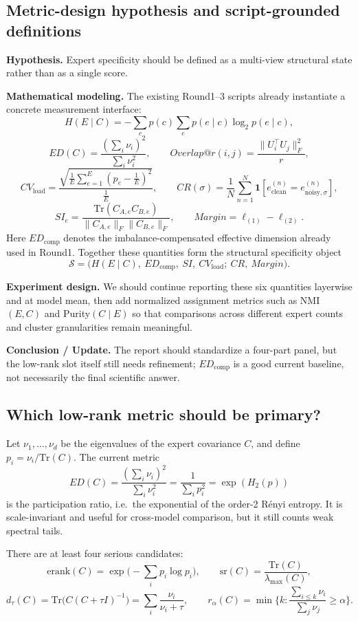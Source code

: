 \documentclass[11pt]{article}
\begin{document}
\subsection{Metric-design hypothesis and script-grounded definitions}
\textbf{Hypothesis.} Expert specificity should be defined as a multi-view structural state rather than as a single score.

\textbf{Mathematical modeling.} The existing Round1--3 scripts already instantiate a concrete measurement interface:
\[
H(E\mid C)
=
-\sum_c p(c)\sum_e p(e\mid c)\log_2 p(e\mid c),
\]
\[
ED(C)=\frac{(\sum_i \nu_i)^2}{\sum_i \nu_i^2},
\qquad
Overlap@r(i,j)=\frac{\|U_i^\top U_j\|_F^2}{r},
\]
\[
CV_{\mathrm{load}}
=
\frac{\sqrt{\frac{1}{E}\sum_{e=1}^E (p_e-\frac{1}{E})^2}}{\frac{1}{E}},
\qquad
CR(\sigma)=\frac{1}{N}\sum_{n=1}^N \mathbf{1}[e_{\mathrm{clean}}^{(n)}=e_{\mathrm{noisy},\sigma}^{(n)}],
\]
\[
SI_e=\frac{\mathrm{Tr}(C_{A,e}C_{B,e})}{\|C_{A,e}\|_F\|C_{B,e}\|_F},
\qquad
Margin=\ell_{(1)}-\ell_{(2)}.
\]
Here $ED_{\mathrm{comp}}$ denotes the imbalance-compensated effective dimension already used in Round1. Together these quantities form the structural specificity object
\[
\mathcal{S}
=
\big(H(E\mid C),\ ED_{\mathrm{comp}},\ SI,\ CV_{\mathrm{load}};\ CR,\ Margin\big).
\]

\textbf{Experiment design.} We should continue reporting these six quantities layerwise and at model mean, then add normalized assignment metrics such as NMI$(E,C)$ and Purity$(C\mid E)$ so that comparisons across different expert counts and cluster granularities remain meaningful.

\textbf{Conclusion / Update.} The report should standardize a four-part panel, but the low-rank slot itself still needs refinement; $ED_{\mathrm{comp}}$ is a good current baseline, not necessarily the final scientific answer.

\subsection{Which low-rank metric should be primary?}
Let $\nu_1,\dots,\nu_d$ be the eigenvalues of the expert covariance $C$, and define $p_i=\nu_i/\mathrm{Tr}(C)$. The current metric
\[
ED(C)=\frac{(\sum_i \nu_i)^2}{\sum_i \nu_i^2}
=
\frac{1}{\sum_i p_i^2}
=
\exp(H_2(p))
\]
is the participation ratio, i.e.\ the exponential of the order-2 R\'enyi entropy. It is scale-invariant and useful for cross-model comparison, but it still counts weak spectral tails.

There are at least four serious candidates:
\[
\mathrm{erank}(C)=\exp\!\Big(-\sum_i p_i\log p_i\Big),
\qquad
\mathrm{sr}(C)=\frac{\mathrm{Tr}(C)}{\lambda_{\max}(C)},
\]
\[
d_\tau(C)=\mathrm{Tr}\!\big(C(C+\tau I)^{-1}\big)=\sum_i \frac{\nu_i}{\nu_i+\tau},
\qquad
r_\alpha(C)=\min\Big\{k:\frac{\sum_{i\le k}\nu_i}{\sum_j \nu_j}\ge \alpha\Big\}.
\]
\end{document}
